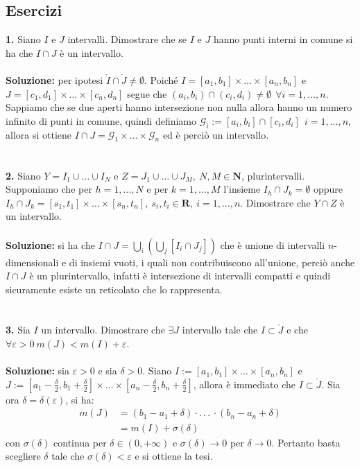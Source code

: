 \documentclass{article}
\begin{document}
\subsection{Esercizi}
\textbf{1.} Siano $I$ e $J$ intervalli. Dimostrare che se $I$ e $J$ hanno punti interni in comune si ha che $I \cap J$ è un intervallo. \\ \\
\textbf{Soluzione:} per ipotesi $\mathring{I} \cap \mathring{J} \neq \emptyset$. Poiché $I = [a_1, b_1] \times \dots \times [a_n, b_n]$ e $J = [c_1, d_1] \times \dots \times [c_n, d_n]$ segue che $(a_i, b_i) \cap (c_i, d_i) \neq \emptyset \ \ \forall i = 1, \dots, n$. Sappiamo che se due aperti hanno intersezione non nulla allora hanno un numero infinito di punti in comune, quindi definiamo $\mathcal{G}_i := [a_i, b_i] \cap [c_i, d_i] \ \ i = 1, \dots, n$, allora si ottiene $I \cap J = \mathcal{G}_1 \times \dots \times \mathcal{G}_n$ ed è perciò un intervallo. \\ \\ \\
\textbf{2.} Siano $Y = I_1 \cup \dots \cup I_N$ e $Z = J_1 \cup \dots \cup J_M, \ N, M \in \mathbf{N}$, plurintervalli. Supponiamo che per $h = 1, \dots, N$ e per $k = 1, \dots, M$ l'insieme $I_h \cap J_k = \emptyset$ oppure $I_h \cap J_k = [s_1, t_1] \times \dots \times [s_n, t_n], \ s_i, t_i \in \mathbf{R}, \ i = 1, \dots, n$. Dimostrare che $Y \cap Z$ è un intervallo. \\ \\
\textbf{Soluzione:} si ha che $I \cap J = \bigcup_i \left( \bigcup_j \left[ I_i \cap J_j \right] \right)$ che è unione di intervalli $n$-dimensionali e di insiemi vuoti, i quali non contribuiscono all'unione, perciò anche $I \cap J$ è un plurintervallo, infatti è intersezione di intervalli compatti e quindi sicuramente esiste un reticolato che lo rappresenta. \\ \\ \\
\textbf{3.} Sia $I$ un intervallo. Dimostrare che $\exists J$ intervallo tale che  $I \subset \mathring{J}$ e che $\forall \varepsilon > 0 \ m(J) < m(I) + \varepsilon$. \\ \\
\textbf{Soluzione:} sia $\varepsilon > 0$ e sia $\delta > 0$. Siano $I := [a_1, b_1] \times \dots \times [a_n, b_n]$ e \\$J := [a_1 - \frac{\delta}{2}, b_1 + \frac{\delta}{2}] \times \dots \times [a_n - \frac{\delta}{2}, b_n + \frac{\delta}{2}]$, allora è immediato che $I \subset \mathring{J}$. Sia ora $\delta = \delta(\varepsilon)$, si ha:
\begin{align*}
    m(J) &= (b_1 - a_1 + \delta) \cdot .\, .\, .\, \cdot (b_n - a_n + \delta) \\
    &= m(I) + \sigma (\delta)
\end{align*}
con $\sigma(\delta)$ continua per $\delta \in (0, + \infty)$ e $\sigma(\delta) \rightarrow 0$ per $\delta \rightarrow 0$. Pertanto basta scegliere $\delta$ tale che $\sigma(\delta) < \varepsilon$ e si ottiene la tesi. \newpage
\end{document}
